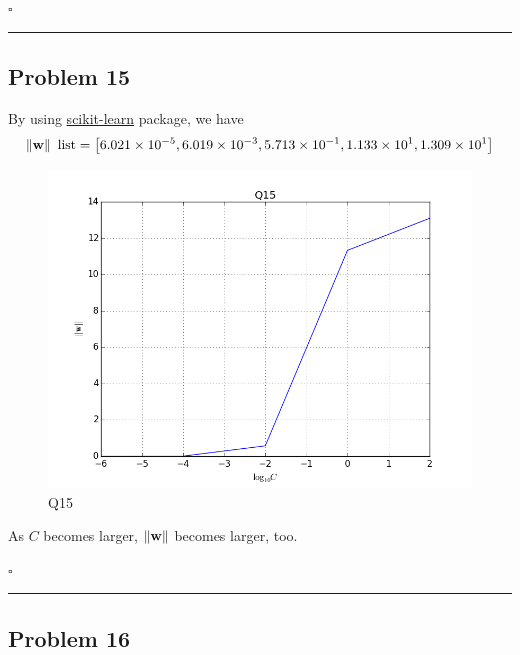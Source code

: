 \documentclass[12pt]{article}
\newcommand*{\QEDB}{\hfill\ensuremath{\square}}
\newcommand{\SBrackets}[1]{\left[#1\right]}
\newcommand{\BF}[1]{{\bf#1}}
\newcommand{\VecAbsVal}[1]{\left\|#1\right\|}
\newcommand{\SciNum}[2]{#1\times{10}^{#2}}
\newcommand{\horrule}[1]{\rule{\linewidth}{#1}}
\begin{document}
\QEDB

\horrule{0.5pt}

\subsection*{Problem 15}

By using \url{scikit-learn} package, we have
\begin{align}
\VecAbsVal{\BF{w}}\text{ list}=\SBrackets{\SciNum{6.021}{-5}, \SciNum{6.019}{-3}, \SciNum{5.713}{-1}, \SciNum{1.133}{1}, \SciNum{1.309}{1}}
\end{align}
\begin{figure}[H]
	\centering
	\includegraphics[scale=0.5]{Q15.png}
	\caption{Q15}
	\label{Q15}
\end{figure}
As $C$ becomes larger, $\VecAbsVal{\BF{w}}$ becomes larger, too.

\QEDB

\horrule{0.5pt}

\subsection*{Problem 16}
\end{document}
